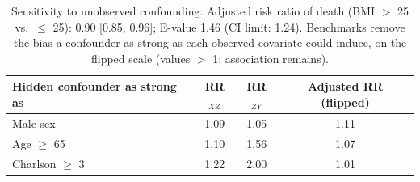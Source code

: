 \begin{table}

\caption{\label{tab:sensitivity}Sensitivity to unobserved confounding. Adjusted risk ratio of death (BMI $>$ 25 vs.\ $\le$ 25): 0.90 [0.85, 0.96]; E-value 1.46 (CI limit: 1.24). Benchmarks remove the bias a confounder as strong as each observed covariate could induce, on the flipped scale (values $>$ 1: association remains).}
\centering
\begin{tabular}[t]{lccc}
\toprule
Hidden confounder as strong as & RR$_{XZ}$ & RR$_{ZY}$ & Adjusted RR (flipped)\\
\midrule
Male sex & 1.09 & 1.05 & 1.11\\
Age $\ge$ 65 & 1.10 & 1.56 & 1.07\\
Charlson $\ge$ 3 & 1.22 & 2.00 & 1.01\\
\bottomrule
\end{tabular}
\end{table}

